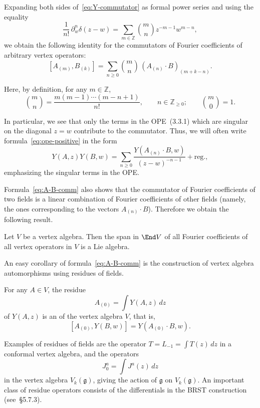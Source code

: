 \documentclass[12pt]{article}
\begin{document}
Expanding both sides of~\eqref{eq:Y-commutator} as formal power series and using the equality
\[
    \frac{1}{n!}\,\partial_w^n\delta(z-w)
    = \sum_{m\in\mathbb{Z}}\binom{m}{n}z^{-m-1}w^{m-n},
\]
we obtain the following identity for the commutators of Fourier coefficients of arbitrary vertex operators:
\begin{equation}\label{eq:A-B-comm}
    [A_{(m)},B_{(k)}]
    = \sum_{n\ge0}\binom{m}{n}\,(A_{(n)}\cdot B)_{(m+k-n)}.
\end{equation}

Here, by definition, for any $m\in\mathbb{Z}$,
\[
    \binom{m}{n}
    = \frac{m(m-1)\cdots(m-n+1)}{n!}, \qquad n\in\mathbb{Z}_{\ge0}; \qquad \binom{m}{0}=1.
\]

In particular, we see that only the terms in the OPE~(3.3.1) which are singular on the diagonal $z=w$ contribute to the commutator.
Thus, we will often write formula~\eqref{eq:ope-positive} in the form
\[
    Y(A,z)Y(B,w)
    = \sum_{n\ge0}\frac{Y(A_{(n)}\cdot B,w)}{(z-w)^{-n-1}} + \text{reg.},
\]
emphasizing the singular terms in the OPE.

Formula~\eqref{eq:A-B-comm} also shows that the commutator of Fourier coefficients of two fields is a linear combination of Fourier coefficients of other fields (namely, the ones corresponding to the vectors $A_{(n)}\cdot B$).
Therefore we obtain the following result.

\begin{proposition}[3.3.7]
    Let $V$ be a vertex algebra.
    Then the span in $\End V$ of all Fourier coefficients of all vertex operators in $V$ is a Lie algebra.
\end{proposition}

An easy corollary of formula~\eqref{eq:A-B-comm} is the construction of vertex algebra automorphisms using residues of fields.

\begin{corollary}[3.3.8]
    For any $A\in V$, the residue
    \[
        A_{(0)} = \int Y(A,z)\,dz
    \]
    of $Y(A,z)$ is an  of the vertex algebra $V$, that is,
    \[
        [A_{(0)},Y(B,w)] = Y(A_{(0)}\cdot B,w).
    \]
\end{corollary}

\noindent
Examples of residues of fields are the operator $T = L_{-1} = \int T(z)\,dz$ in a conformal vertex algebra, and the operators
\[
    J^a_0 = \int J^a(z)\,dz
\]
in the vertex algebra $V_k(\mathfrak{g})$, giving the action of $\mathfrak{g}$ on $V_k(\mathfrak{g})$.
An important class of residue operators consists of the differentials in the BRST construction (see~\S5.7.3).
\end{document}
